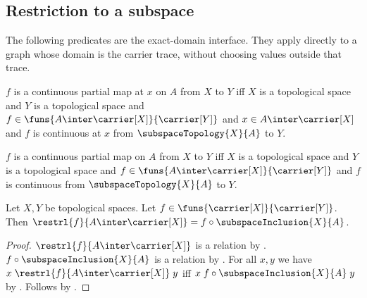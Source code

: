\subsection{Restriction to a subspace}

The following predicates are the exact-domain interface.  They apply directly
to a graph whose domain is the carrier trace, without choosing values outside
that trace.

\begin{definition}\label{continuous_at_as_map_on}
    $f$ is a continuous partial map at $x$ on $A$ from $X$ to $Y$ iff
        $X$ is a topological space and
        $Y$ is a topological space and
        $f\in\funs{A\inter\carrier[X]}{\carrier[Y]}$ and
        $x\in A\inter\carrier[X]$ and
        $f$ is continuous at $x$ from $\subspaceTopology{X}{A}$ to $Y$.
\end{definition}

\begin{definition}\label{continuous_as_map_on}
    $f$ is a continuous partial map on $A$ from $X$ to $Y$ iff
        $X$ is a topological space and
        $Y$ is a topological space and
        $f\in\funs{A\inter\carrier[X]}{\carrier[Y]}$ and
        $f$ is continuous from $\subspaceTopology{X}{A}$ to $Y$.
\end{definition}

\begin{proposition}\label{restriction_is_composition_with_subspace_inclusion}
    Let $X,Y$ be topological spaces.
    Let $f\in\funs{\carrier[X]}{\carrier[Y]}$.
    Then
        $\restrl{f}{A\inter\carrier[X]}
            =f\circ\subspaceInclusion{X}{A}$.
\end{proposition}
\begin{proof}
    $\restrl{f}{A\inter\carrier[X]}$ is a relation by
        .
    $f\circ\subspaceInclusion{X}{A}$ is a relation by
        .
    For all $x,y$ we have
        $x\mathrel{\restrl{f}{A\inter\carrier[X]}}y$ iff
        $x\mathrel{f\circ\subspaceInclusion{X}{A}}y$ by
        .
    Follows by .
\end{proof}

